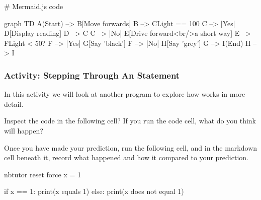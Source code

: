 \documentclass[letterpaper,10pt,english]{sphinxmanual}
\begin{document}
{# Mermaid.js code

graph TD
    A(Start) --> B[Move forwards]
    B --> C{Light == 100}
    C --> |Yes| D[Display reading]
    D --> C
    C --> |No| E[Drive forward<br/>a short way]
    E --> F{Light < 50?}
    F --> |Yes| G[Say 'black']
    F --> |No| H[Say 'grey']
    G --> I(End)
    H --> I


\subsubsection{Activity: Stepping Through An  Statement}
\label{\detokenize{content/02_Robot_Lab/Section_00_02:Activity:-Stepping-Through-An-if..else...-Statement}}
In this activity we will look at another program to explore how  works in more detail.

Inspect the code in the following cell? If you run the code cell, what do you think will happen?


Once you have made your prediction, run the following cell, and in the markdown cell beneath it, record what happened and how it compared to your prediction.


{
\begin{sphinxVerbatim}[commandchars=\\\{\}]
\llap{\color{nbsphinxin}[ ]:\,\hspace{\fboxrule}\hspace{\fboxsep}}\PYGZsh{}\PYGZpc{}\PYGZpc{}nbtutor \PYGZhy{}\PYGZhy{}reset \PYGZhy{}\PYGZhy{}force
x = 1

if x == 1:
    print(\PYGZdq{}x equals 1\PYGZdq{})
else:
    print(\PYGZdq{}x does not equal 1\PYGZdq{})


\end{sphinxVerbatim}}}
\end{document}
